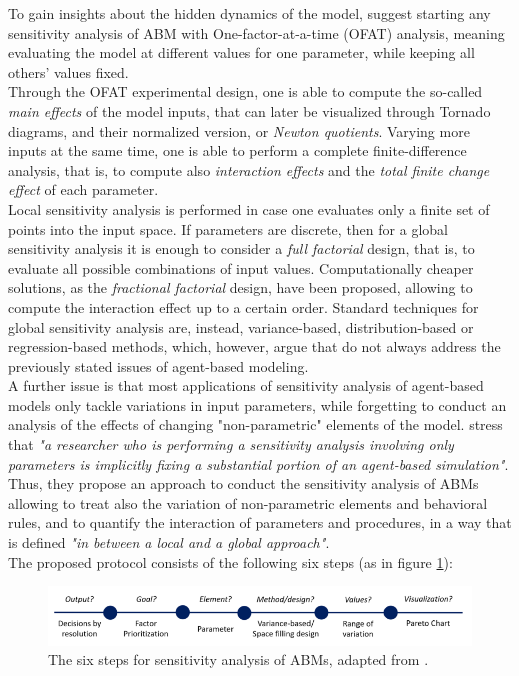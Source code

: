 To gain insights about the hidden dynamics of the model, \textcite{Broeke2016WhichSA} suggest starting any sensitivity analysis of ABM with One-factor-at-a-time (OFAT) analysis, meaning evaluating the model at different values for one parameter, while keeping all others' values fixed. \\ Through the OFAT experimental design, one is able to compute the so-called \textit{main effects} of the model inputs, that can later be visualized through Tornado diagrams, and their normalized version, or \textit{Newton quotients}. Varying more inputs at the same time, one is able to perform a complete finite-difference analysis, that is, to compute also \textit{interaction effects} and the \textit{total finite change effect} of each parameter. \\ Local sensitivity analysis is performed in case one evaluates only a finite set of points into the input space. If parameters are discrete, then for a global sensitivity analysis it is enough to consider a \textit{full factorial} design, that is, to evaluate all possible combinations of input values. Computationally cheaper solutions, as the \textit{fractional factorial} design, have been proposed, allowing to compute the interaction effect up to a certain order. Standard techniques for global sensitivity analysis are, instead, variance-based, distribution-based or regression-based methods, which, however, \textcite{Broeke2016WhichSA} argue that do not always address the previously stated issues of agent-based modeling. \\ A further issue is that most applications of sensitivity analysis of agent-based models only tackle variations in input parameters, while forgetting to conduct an analysis of the effects of changing "non-parametric" elements of the model. \textcite{Borgonovo2022SensitivityAO} stress that \textit{"a researcher who is performing a sensitivity analysis involving only parameters is implicitly fixing a substantial portion of an agent-based simulation"}. Thus, they propose an approach to conduct the sensitivity analysis of ABMs allowing to treat also the variation of non-parametric elements and behavioral rules, and to quantify the interaction of parameters and procedures, in a way that is defined \textit{"in between a local and a global approach"}. \\ The proposed protocol consists of the following six steps (as in figure \ref{fig:borgonovo_protocol}):

\begin{figure}[t!]
    \centering
    \includegraphics[width = \textwidth]{tex/pics/borgonovo_protocol.png}
    \caption{The six steps for sensitivity analysis of ABMs, adapted from \textcite{Borgonovo2022SensitivityAO}.}
    \label{fig:borgonovo_protocol}
\end{figure}

